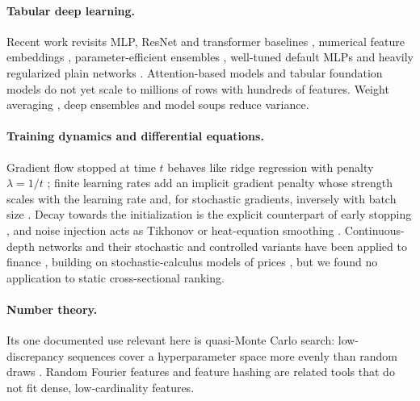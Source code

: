 \documentclass[11pt]{article}
\begin{document}
\paragraph{Tabular deep learning.}
Recent work revisits MLP, ResNet and transformer baselines \citep{gorishniy2021revisiting},
numerical feature embeddings \citep{gorishniy2022embeddings}, parameter-efficient ensembles
\citep{gorishniy2025tabm}, well-tuned default MLPs \citep{holzmuller2024better} and heavily
regularized plain networks \citep{kadra2021well}. Attention-based models \citep{somepalli2021saint}
and tabular foundation models \citep{hollmann2025tabpfn,tabpfn25,tabpfn3} do not yet scale to
millions of rows with hundreds of features. Weight averaging \citep{izmailov2018averaging},
deep ensembles \citep{lakshminarayanan2017simple} and model soups \citep{wortsman2022model}
reduce variance.

\paragraph{Training dynamics and differential equations.}
Gradient flow stopped at time $t$ behaves like ridge regression with penalty $\lambda = 1/t$
\citep{ali2019continuous}; finite learning rates add an implicit gradient penalty whose
strength scales with the learning rate and, for stochastic gradients, inversely with batch
size \citep{barrett2021implicit,smith2021origin,li2017stochastic}. Decay towards the
initialization is the explicit counterpart of early stopping \citep{li2018explicit}, and noise
injection acts as Tikhonov or heat-equation smoothing
\citep{bishop1995training,camuto2020explicit,campbell2020deterministic,wang2024convection}.
Continuous-depth networks
\citep{chen2018neural,dupont2019augmented,finlay2020train,kelly2020learning,haber2017stable,ruthotto2020deep}
and their stochastic and controlled variants
\citep{liu2019neural,li2020scalable,kidger2020neural} have been applied to finance
\citep{gierjatowicz2020robust,yang2021neural}, building on stochastic-calculus models of
prices \citep{black1973pricing}, but we found no application to static cross-sectional
ranking.

\paragraph{Number theory.}
Its one documented use relevant here is quasi-Monte Carlo search: low-discrepancy sequences
cover a hyperparameter space more evenly than random draws
\citep{bousquet2017critical,roy2023qmc}. Random Fourier features
\citep{rahimi2007random,avron2016qmc} and feature hashing \citep{weinberger2009feature} are
related tools that do not fit dense, low-cardinality features.
\end{document}
